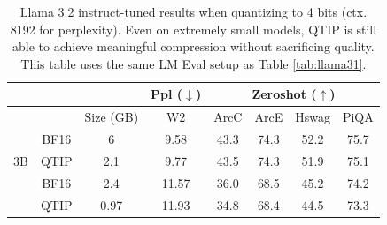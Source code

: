 \begin{table}[ht!]
\caption{Llama 3.2 instruct-tuned results when quantizing to 4 bits (ctx. 8192 for perplexity). Even on extremely small models, QTIP is still able to achieve meaningful compression without sacrificing quality. This table uses the same LM Eval setup as Table \ref{tab:llama31}.}
\label{tab:llama32}
\small\sc\centering
\begin{tabular}{@{}cccccccc@{}}
                                                                  &                                                   &                                                   & Ppl ($\downarrow$)                                 & \multicolumn{4}{c}{Zeroshot ($\uparrow$)} \\ \midrule
                                                                  & \multicolumn{1}{c|}{}                             & \multicolumn{1}{c|}{Size (GB)}                    & \multicolumn{1}{c|}{W2}                            & ArcC     & ArcE     & Hswag     & PiQA    \\ \midrule
\multicolumn{1}{c|}{}                                             & \multicolumn{1}{c|}{BF16}                         & \multicolumn{1}{c|}{6}                            & \multicolumn{1}{c|}{9.58}                          & 43.3     & 74.3     & 52.2      & 75.7    \\
\multicolumn{1}{c|}{\multirow{-2}{*}{3B}}                         & \multicolumn{1}{c|}{QTIP}                         & \multicolumn{1}{c|}{2.1}                          & \multicolumn{1}{c|}{9.77}                          & 43.5     & 74.3     & 51.9      & 75.1    \\
\rowcolor[HTML]{D9D9D9} 
\multicolumn{1}{c|}{\cellcolor[HTML]{D9D9D9}}                     & \multicolumn{1}{c|}{\cellcolor[HTML]{D9D9D9}BF16} & \multicolumn{1}{c|}{\cellcolor[HTML]{D9D9D9}2.4}  & \multicolumn{1}{c|}{\cellcolor[HTML]{D9D9D9}11.57} & 36.0     & 68.5     & 45.2      & 74.2    \\
\rowcolor[HTML]{D9D9D9} 
\multicolumn{1}{c|}{\multirow{-2}{*}{\cellcolor[HTML]{D9D9D9}1B}} & \multicolumn{1}{c|}{\cellcolor[HTML]{D9D9D9}QTIP} & \multicolumn{1}{c|}{\cellcolor[HTML]{D9D9D9}0.97} & \multicolumn{1}{c|}{\cellcolor[HTML]{D9D9D9}11.93} & 34.8     & 68.4     & 44.5      & 73.3    \\ \bottomrule
\end{tabular}
\end{table}